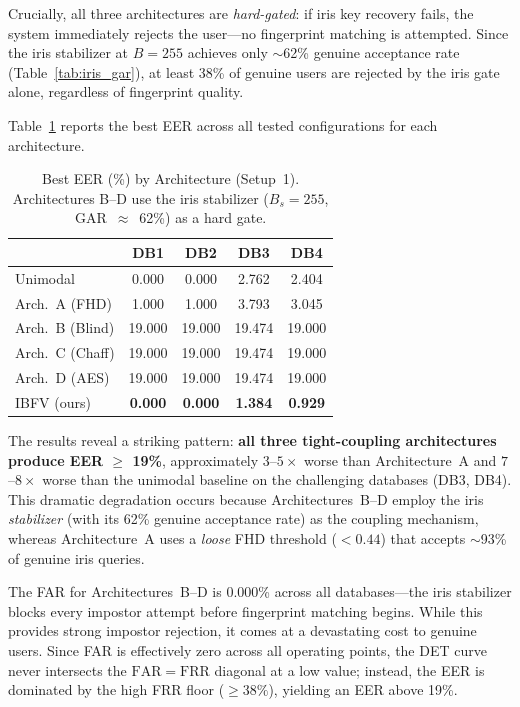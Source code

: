 \documentclass[3p,twocolumn]{elsarticle}
\newcommand{\IBFV}{\textsf{IBFV}}
\newcommand{\FAR}{\mathrm{FAR}}
\newcommand{\FRR}{\mathrm{FRR}}
\begin{document}
Crucially, all three architectures are \emph{hard-gated}: if iris key recovery fails, the system immediately rejects the user---no fingerprint matching is attempted. Since the iris stabilizer at $B = 255$ achieves only $\sim$62\% genuine acceptance rate (Table~\ref{tab:iris_gar}), at least 38\% of genuine users are rejected by the iris gate alone, regardless of fingerprint quality.

Table~\ref{tab:arch_bcd} reports the best EER across all tested configurations for each architecture.

\begin{table}[t]
\centering
\caption{Best EER (\%) by Architecture (Setup~1). Architectures B--D use the iris stabilizer ($B_s = 255$, GAR~$\approx$~62\%) as a hard gate.}
\label{tab:arch_bcd}
\begin{tabular}{@{}l c c c c@{}}
\toprule
 & \textbf{DB1} & \textbf{DB2} & \textbf{DB3} & \textbf{DB4} \\
\midrule
Unimodal        & 0.000 & 0.000 & 2.762 & 2.404 \\
Arch.~A (FHD)   & 1.000 & 1.000 & 3.793 & 3.045 \\
Arch.~B (Blind) & 19.000 & 19.000 & 19.474 & 19.000 \\
Arch.~C (Chaff) & 19.000 & 19.000 & 19.474 & 19.000 \\
Arch.~D (AES)   & 19.000 & 19.000 & 19.474 & 19.000 \\
\IBFV{} (ours)  & \textbf{0.000} & \textbf{0.000} & \textbf{1.384} & \textbf{0.929} \\
\bottomrule
\end{tabular}
\end{table}

The results reveal a striking pattern: \textbf{all three tight-coupling architectures produce EER $\geq$ 19\%}, approximately $3$--$5\times$ worse than Architecture~A and $7$--$8\times$ worse than the unimodal baseline on the challenging databases (DB3, DB4). This dramatic degradation occurs because Architectures~B--D employ the iris \emph{stabilizer} (with its 62\% genuine acceptance rate) as the coupling mechanism, whereas Architecture~A uses a \emph{loose} FHD threshold ($< 0.44$) that accepts $\sim$93\% of genuine iris queries.

The FAR for Architectures~B--D is 0.000\% across all databases---the iris stabilizer blocks every impostor attempt before fingerprint matching begins. While this provides strong impostor rejection, it comes at a devastating cost to genuine users. Since FAR is effectively zero across all operating points, the DET curve never intersects the $\FAR = \FRR$ diagonal at a low value; instead, the EER is dominated by the high FRR floor ($\geq 38\%$), yielding an EER above 19\%.
\end{document}
